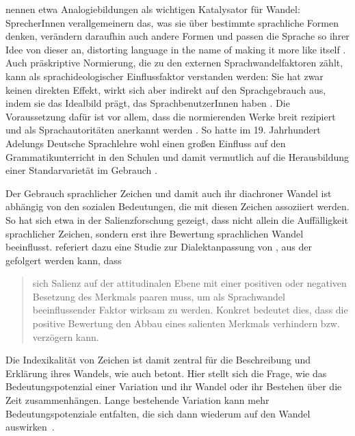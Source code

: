 \citet[]{Woolard1994} nennen etwa Analogiebildungen als wichtigen Katalysator für Wandel: SprecherInnen verallgemeinern das, was sie über bestimmte sprachliche Formen denken, verändern daraufhin auch andere Formen und passen die Sprache so ihrer Idee von dieser an, \glqq distorting language in the name of making it more like itself\grqq{} \citep[70]{Woolard1994}. %
Auch präskriptive Normierung, die \citet[11]{Banhold2015} zu den externen Sprachwandelfaktoren zählt, kann als sprachideologischer Einflussfaktor verstanden werden: 
Sie hat zwar keinen direkten Effekt, wirkt sich aber indirekt auf den Sprachgebrauch aus, indem sie das Idealbild prägt, das SprachbenutzerInnen haben \citep[s.][69]{Woolard1994}.
Die Voraussetzung dafür ist vor allem, dass die normierenden Werke breit rezipiert und als Sprachautoritäten anerkannt werden \citep[s.][4]{Elspa.2005}.
So hatte im 19. Jahrhundert Adelungs \glqq Deutsche Sprachlehre\grqq{} wohl einen großen Einfluss auf den Grammatikunterricht in den Schulen und damit vermutlich auf die Herausbildung einer Standarvarietät im Gebrauch \citep[s.][5]{Elspa.2005}.

Der Gebrauch sprachlicher Zeichen und damit auch ihr diachroner Wandel ist abh{\"a}ngig von den sozialen Bedeutungen, die mit diesen Zeichen assoziiert werden.
So hat sich etwa in der Salienzforschung gezeigt, dass nicht allein die Auffälligkeit sprachlicher Zeichen, sondern erst ihre Bewertung sprachlichen Wandel beeinflusst. 
\citet[94]{Lenz2010} referiert dazu eine Studie zur Dialektanpassung von \citet{Auer.1996}, aus der gefolgert werden kann, dass \begin{quote} sich Salienz auf der attitudinalen Ebene mit einer positiven oder negativen Besetzung des Merkmals paaren muss, um als Sprachwandel beeinflussender Faktor wirksam zu werden. 
Konkret bedeutet dies, dass die positive Bewertung den Abbau eines salienten Merkmals verhindern bzw. verz{\"o}gern kann.~\citep[94]{Lenz2010} \end{quote}
Die Indexikalit{\"a}t von Zeichen ist damit zentral f{\"u}r die Beschreibung und Erkl{\"a}rung ihres Wandels, wie auch \citet[132]{Gal.2016} betont.
Hier stellt sich die Frage, wie das Bedeutungspotenzial einer Variation und ihr Wandel oder ihr Bestehen {\"u}ber die Zeit zusammenh{\"a}ngen. 
Lange bestehende Variation kann mehr Bedeutungspotenziale entfalten, die sich dann wiederum auf den Wandel auswirken~\citep[s.][82]{Eckert.2016}.

